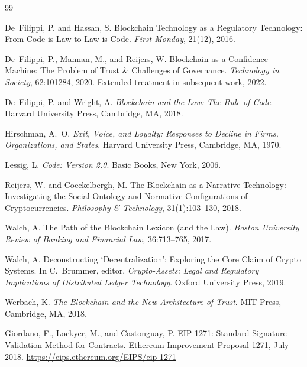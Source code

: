 \documentclass[11pt,a4paper]{article}
\theoremstyle{remark}
\begin{document}
\begin{thebibliography}{99}

De~Filippi, P. and Hassan, S.
\newblock Blockchain Technology as a Regulatory Technology: From
  Code is Law to Law is Code.
\newblock \emph{First Monday}, 21(12), 2016.

De~Filippi, P., Mannan, M., and Reijers, W.
\newblock Blockchain as a Confidence Machine: The Problem of
  Trust \& Challenges of Governance.
\newblock \emph{Technology in Society}, 62:101284, 2020.
\newblock Extended treatment in subsequent work, 2022.

De~Filippi, P. and Wright, A.
\newblock \emph{Blockchain and the Law: The Rule of Code}.
\newblock Harvard University Press, Cambridge, MA, 2018.

Hirschman, A.~O.
\newblock \emph{Exit, Voice, and Loyalty: Responses to Decline in
  Firms, Organizations, and States}.
\newblock Harvard University Press, Cambridge, MA, 1970.

Lessig, L.
\newblock \emph{Code: Version 2.0}.
\newblock Basic Books, New York, 2006.

Reijers, W. and Coeckelbergh, M.
\newblock The Blockchain as a Narrative Technology: Investigating
  the Social Ontology and Normative Configurations of
  Cryptocurrencies.
\newblock \emph{Philosophy \& Technology}, 31(1):103--130, 2018.

Walch, A.
\newblock The Path of the Blockchain Lexicon (and the Law).
\newblock \emph{Boston University Review of Banking and Financial
  Law}, 36:713--765, 2017.

Walch, A.
\newblock Deconstructing `Decentralization': Exploring the Core
  Claim of Crypto Systems.
\newblock In C.~Brummer, editor, \emph{Crypto-Assets: Legal and
  Regulatory Implications of Distributed Ledger Technology}.
  Oxford University Press, 2019.

Werbach, K.
\newblock \emph{The Blockchain and the New Architecture of Trust}.
\newblock MIT Press, Cambridge, MA, 2018.

Giordano, F., Lockyer, M., and Castonguay, P.
\newblock EIP-1271: Standard Signature Validation Method for
  Contracts.
\newblock Ethereum Improvement Proposal 1271, July 2018.
\newblock \url{https://eips.ethereum.org/EIPS/eip-1271}


\end{thebibliography}
\end{document}
